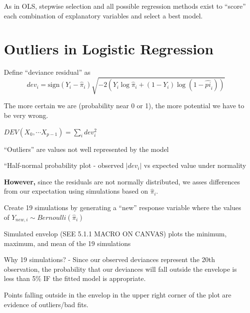 \documentclass[12pt]{notes}
\begin{document}
\nspace
As in OLS, stepwise selection and all possible regression methods exist to ``score'' each combination of explanatory variables and select a best model. 



\section{Outliers in Logistic Regression}

\begin{minipage}[l][2cm][c]{\textwidth}
\end{minipage}

\bi
\item Define ``deviance residual'' as 
$$dev_i = \text{sign}(Y_i - \hat{\pi}_i)\sqrt{-2\left(Y_i\log\hat{\pi}_i + (1-Y_i)\log(1-\hat{pi}_i)\right)}$$
\bi
\item The more certain we are (probability near 0 or 1), the more potential we have to be very wrong. 
\ei
\item $DEV(X_0, \cdots X_{p-1}) = \sum_i dev_i^2$
\item ``Outliers'' are values not well represented by the model
\item ``Half-normal probability plot - observed $|dev_i|$ vs expected value under normality
\bi
\item \textbf{However,} since the residuals are not normally distributed, we asses differences from our expectation using simulations based on $\hat{\pi}_i$. 
\bi
\item Create 19 simulations by generating a ``new'' response variable where the values of $Y_{new, i} \sim Bernoulli(\hat{\pi}_i)$
\ei
\item Simulated envelop (SEE 5.1.1 MACRO ON CANVAS) plots the minimum, maximum, and mean of the 19 simulations
\bi
\item Why 19 simulations? - Since our observed deviances represent the 20th observation, the probability that our deviances will fall outside the envelope is less than 5\% IF the fitted model is appropriate. 
\item Points falling outside in the envelop in the upper right corner of the plot are evidence of outliers/bad fits. 
\ei
\ei
\ei
\end{document}

